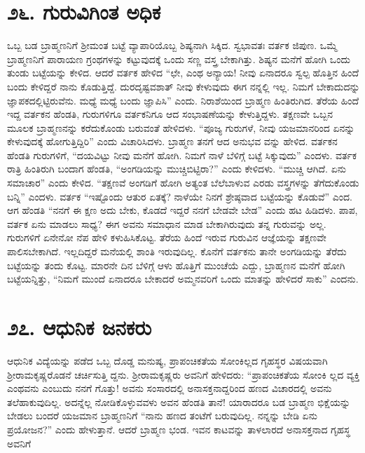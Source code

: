 \section{\num{೨೬. } ಗುರುವಿಗಿಂತ ಅಧಿಕ}

ಒಬ್ಬ ಬಡ ಬ್ರಾಹ್ಮಣನಿಗೆ ಶ್ರೀಮಂತ ಬಟ್ಟೆ ವ್ಯಾಪಾರಿಯೊಬ್ಬ ಶಿಷ್ಯನಾಗಿ ಸಿಕ್ಕಿದ. ಸ್ವಭಾವತಃ ವರ್ತಕ ಜಿಪುಣ. ಒಮ್ಮೆ ಬ್ರಾಹ್ಮಣನಿಗೆ ಪಾರಾಯಣ ಗ್ರಂಥಗಳನ್ನು ಕಟ್ಟುವುದಕ್ಕೆ ಒಂದು ಸಣ್ಣ ವಸ್ತ್ರ ಬೇಕಾಗಿತ್ತು. ಶಿಷ್ಯನ ಮನೆಗೆ ಹೋಗಿ ಒಂದು ತುಂಡು ಬಟ್ಟೆಯನ್ನು ಕೇಳಿದ. ಆದರೆ ವರ್ತಕ ಹೇಳಿದ “ಛೇ, ಎಂಥ ಅನ್ಯಾಯ! ನೀವು ಏನಾದರೂ ಸ್ವಲ್ಪ ಹೊತ್ತಿನ ಹಿಂದೆ ಬಂದು ಕೇಳಿದ್ದರೆ ನಾನು ಕೊಡುತ್ತಿದ್ದೆ. ದುರದೃಷ್ಟವಶಾತ್ ನೀವು ಕೇಳುವುದು ಈಗ ನನ್ನಲ್ಲಿ ಇಲ್ಲ. ನಿಮಗೆ ಬೇಕಾದುದನ್ನು ಜ್ಞಾಪಕದಲ್ಲಿಟ್ಟಿರುವೆನು. ಮಧ್ಯೆ ಮಧ್ಯೆ ಬಂದು ಜ್ಞಾಪಿಸಿ” ಎಂದು. ನಿರಾಶೆಯಿಂದ ಬ್ರಾಹ್ಮಣ ಹಿಂತಿರುಗಿದ. ತೆರೆಯ ಹಿಂದೆ ಇದ್ದ ವರ್ತಕನ ಹೆಂಡತಿ, ಗುರುಗಳಿಗೂ ವರ್ತಕನಿಗೂ ಆದ ಸಂಭಾಷಣೆಯನ್ನು ಕೇಳುತ್ತಿದ್ದಳು. ತಕ್ಷಣವೇ ಒಬ್ಬನ ಮೂಲಕ ಬ್ರಾಹ್ಮಣನನ್ನು ಕರೆದುಕೊಂಡು ಬರುವಂತೆ ಹೇಳಿದಳು. “ಪೂಜ್ಯ ಗುರುಗಳೆ, ನೀವು ಯಜಮಾನರಿಂದ ಏನನ್ನು ಕೇಳುವುದಕ್ಕೆ ಹೋಗುತ್ತಿದ್ದಿರಿ” ಎಂದು ವಿಚಾರಿಸಿದಳು. ಬ್ರಾಹ್ಮಣ ತನಗೆ ಆದ ಅನುಭವ ವನ್ನು ಹೇಳಿದ. ವರ್ತಕನ ಹೆಂಡತಿ ಗುರುಗಳಿಗೆ, “ದಯವಿಟ್ಟು ನೀವು ಮನೆಗೆ ಹೋಗಿ. ನಿಮಗೆ ನಾಳೆ ಬೆಳಿಗ್ಗೆ ಬಟ್ಟೆ ಸಿಕ್ಕುವುದು” ಎಂದಳು. ವರ್ತಕ ರಾತ್ರಿ ಹಿಂತಿರುಗಿ ಬಂದಾಗ ಹೆಂಡತಿ, “ಅಂಗಡಿಯನ್ನು ಮುಚ್ಚಿಬಿಟ್ಟಿರಾ?” ಎಂದು ಕೇಳಿದಳು. “ಮುಚ್ಚಿ ಆಗಿದೆ. ಏನು ಸಮಾಚಾರ” ಎಂದು ಕೇಳಿದ. “ತಕ್ಷಣವೆ ಅಂಗಡಿಗೆ ಹೋಗಿ ಅತ್ಯಂತ ಬೆಲೆಬಾಳುವ ಎರಡು ವಸ್ತ್ರಗಳನ್ನು ತೆಗೆದುಕೊಂಡು ಬನ್ನಿ” ಎಂದಳು. ವರ್ತಕ “ಇಷ್ಟೊಂದು ಆತುರ ಏತಕ್ಕೆ? ನಾಳೆಯೇ ನಿನಗೆ ಶ್ರೇಷ್ಠವಾದ ಬಟ್ಟೆಯನ್ನು ಕೊಡುವೆ” ಎಂದ. ಆಗ ಹೆಂಡತಿ “ನನಗೆ ಈ ಕ್ಷಣ ಅದು ಬೇಕು, ಕೊಡದೆ ಇದ್ದರೆ ನನಗೆ ಬೇಡವೇ ಬೇಡ” ಎಂದು ಹಟ ಹಿಡಿದಳು. ಪಾಪ, ವರ್ತಕ ಏನು ಮಾಡಲು ಸಾಧ್ಯ? ಈಗ ಅವನು ಸಮಾಧಾನ ಮಾಡ ಬೇಕಾಗಿರುವುದು ತನ್ನ ಗುರುವನ್ನು ಅಲ್ಲ. ಗುರುಗಳಿಗೆ ಏನೇನೋ ನೆಪ ಹೇಳಿ ಕಳುಹಿಸಿಕೊಟ್ಟ. ತೆರೆಯ ಹಿಂದೆ ಇರುವ ಗುರುವಿನ ಆಜ್ಞೆಯನ್ನು ತಕ್ಷಣವೇ ಪಾಲಿಸಬೇಕಾಗಿದೆ. ಇಲ್ಲದಿದ್ದರೆ ಮನೆಯಲ್ಲಿ ಶಾಂತಿ ಇರುವುದಿಲ್ಲ. ಕೊನೆಗೆ ವರ್ತಕನು ತಾನೇ ಅಂಗಡಿಯನ್ನು ತೆರೆದು ಬಟ್ಟೆಯನ್ನು ತಂದು ಕೊಟ್ಟ. ಮಾರನೇ ದಿನ ಬೆಳಿಗ್ಗೆ ಆಳು ಹೊತ್ತಿಗೆ ಮುಂಚೆಯೆ ಎದ್ದು, ಬ್ರಾಹ್ಮಣನ ಮನೆಗೆ ಹೋಗಿ ಬಟ್ಟೆಯನ್ನಿತ್ತು, “ನಿಮಗೆ ಮುಂದೆ ಏನಾದರೂ ಬೇಕಾದರೆ ಅಮ್ಮನವರಿಗೆ ಒಂದು ಮಾತನ್ನು ಹೇಳಿದರೆ ಸಾಕು” ಎಂದನು.


\section{\num{೨೭. } ಆಧುನಿಕ ಜನಕರು}

ಆಧುನಿಕ ವಿದ್ಯೆಯನ್ನು ಪಡೆದ ಒಬ್ಬ ದೊಡ್ಡ ಮನುಷ್ಯ, ಪ್ರಾಪಂಚಿಕತೆಯ ಸೋಂಕಿಲ್ಲದ ಗೃಹಸ್ಥರ ವಿಷಯವಾಗಿ ಶ್ರೀರಾಮಕೃಷ್ಣರೊಡನೆ ಚರ್ಚಿಸುತ್ತಿ ದ್ದನು. ಶ್ರೀರಾಮಕೃಷ್ಣರು ಅವನಿಗೆ ಹೇಳಿದರು: “ಪ್ರಾಪಂಚಿಕತೆಯ ಸೋಂಕಿ ಲ್ಲದ ವ್ಯಕ್ತಿ ಎಂಥವನು ಎಂಬುದು ನನಗೆ ಗೊತ್ತು! ಅವನು ಸಂಸಾರದಲ್ಲಿ ಅನಾಸಕ್ತನಾದ್ದರಿಂದ ಹಣದ ವಿಚಾರದಲ್ಲಿ ಅವನು ತಲೆಹಾಕುವುದಿಲ್ಲ. ಅದನ್ನೆಲ್ಲ ನೋಡಿಕೊಳ್ಳುವವಳು ಅವನ ಹೆಂಡತಿ ತಾನೆ! ಯಾರಾದರೂ ಬಡ ಬ್ರಾಹ್ಮಣ ಭಿಕ್ಷೆಯನ್ನು ಬೇಡಲು ಬಂದರೆ ಯಜಮಾನ ಬ್ರಾಹ್ಮಣನಿಗೆ “ನಾನು ಹಣದ ತಂಟೆಗೆ ಬರುವುದಿಲ್ಲ. ನನ್ನನ್ನು ಬೇಡಿ ಏನು ಪ್ರಯೋಜನ?” ಎಂದು ಹೇಳುತ್ತಾನೆ. ಆದರೆ ಬ್ರಾಹ್ಮಣ ಭಂಡ. ಇವನ ಕಾಟವನ್ನು ತಾಳಲಾರದೆ ಅನಾಸಕ್ತನಾದ ಗೃಹಸ್ಥ ಅವನಿಗೆ



